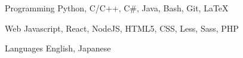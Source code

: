 

\begin{cvskills}

  \cvskill
    {Programming} %
    {Python, C/C++, C\#, Java, Bash, Git, LaTeX} %

  \cvskill
    {Web} %
    {Javascript, React, NodeJS, HTML5, CSS, Less, Sass, PHP} %

  \cvskill
    {Languages} %
    {English, Japanese} %

\end{cvskills}
